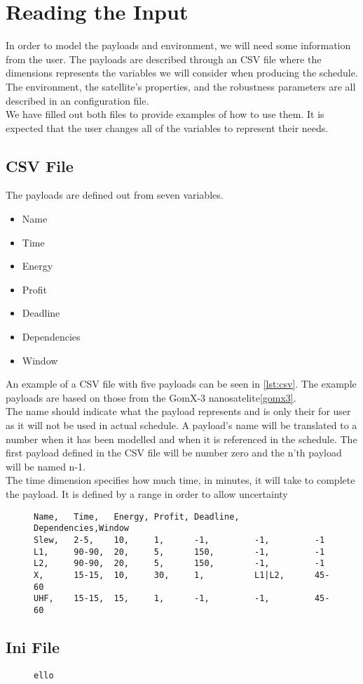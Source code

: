 \section{Reading the Input} \label{sec:read_input}
In order to model the payloads and environment, we will need some information from the user.
The payloads are described through an CSV file where the dimensions represents the variables we will consider when producing the schedule.
The environment, the satellite's properties, and the robustness parameters are all described in an configuration file.\\
We have filled out both files to provide examples of how to use them. 
It is expected that the user changes all of the variables to represent their needs.

\subsection{CSV File} \label{subsec:csv}
The payloads are defined out from seven variables.
\begin{itemize}
	\item	Name
	\item	Time
	\item	Energy
	\item	Profit
	\item	Deadline
	\item	Dependencies
	\item	Window
\end{itemize}
An example of a CSV file with five payloads can be seen in \cref{lst:csv}.
The example payloads are based on those from the GomX-3 nanosatelite\ref{gomx3}.\\
The name should indicate what the payload represents and is only their for user as it will not be used in actual schedule.
A payload's name will be translated to a number when it has been modelled and when it is referenced in the schedule. 
The first payload defined in the CSV file will be number zero and the n'th payload will be named n-1.\\
The time dimension specifies how much time, in minutes, it will take to complete the payload.
It is defined by a range in order to allow uncertainty 
\begin{figure}[H]
\begin{lstlisting}[caption={An example of how five payloads can be defined}, label=lst:csv, language=text]
Name,	Time,	Energy,	Profit,	Deadline,	Dependencies,Window
Slew,	2-5,	10,		1,		-1,			-1,			-1
L1,		90-90,	20,		5,		150,		-1,			-1
L2,		90-90,	20,		5,		150,		-1,			-1
X,		15-15,	10,		30,		1,			L1|L2,		45-60
UHF,	15-15,	15,		1,		-1,			-1,			45-60
\end{lstlisting}
\end{figure}

\subsection{Ini File} \label{subsec:init}


\begin{figure}[H]
\begin{lstlisting}[caption={}, label=lst:ini, language=text]
ello
\end{lstlisting}
\end{figure}